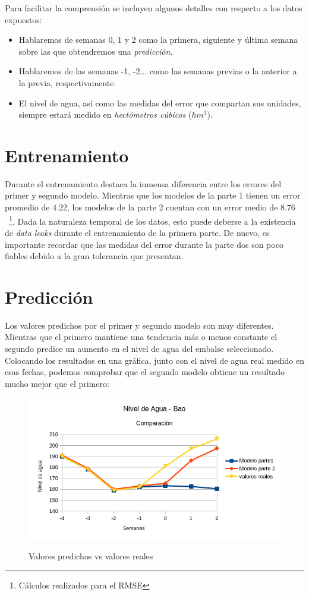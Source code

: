 \documentclass[12pt]{report} %
\begin{document}
Para facilitar la comprensión se incluyen algunos detalles con respecto a los datos expuestos:
\begin{itemize}
    \item Hablaremos de semanas 0, 1 y 2 como la primera, siguiente y última semana sobre las que obtendremos una \textit{predicción}.
    \item Hablaremos de las semanas -1, -2... como las semanas previas o la anterior a la previa, respectivamente.
    \item El nivel de agua, así como las medidas del error que compartan sus unidades, siempre estará medido en \textit{hectómetros cúbicos} ($hm^3$).
\end{itemize}

\section{Entrenamiento}

Durante el entrenamiento destaca la inmensa diferencia entre los errores del primer y segundo modelo. Mientras que los modelos de la parte 1 tienen un error promedio de $4.22$, los modelos de la parte 2 cuentan con un error medio de $8.76$~\footnote{Cálculos realizados para el RMSE}. Dada la naturaleza temporal de los datos, esto puede deberse a la existencia de \textit{data leaks} durante el entrenamiento de la primera parte. De nuevo, es importante recordar que las medidas del error durante la parte dos son poco fiables debido a la gran tolerancia que presentan.

\section{Predicción}

Los valores predichos por el primer y segundo modelo son muy diferentes. Mientras que el primero mantiene una tendencia más o menos constante el segundo predice un aumento en el nivel de agua del embalse seleccionado. Colocando los resultados en una gráfica, junto con el nivel de agua real medido en esas fechas, podemos comprobar que el segundo modelo obtiene un resultado mucho mejor que el primero:

\begin{figure}[H]
    \includegraphics[width=0.85\linewidth]{predict-12-real.png}\\
    \caption{\small Valores predichos vs valores reales}
\end{figure}
\end{document}
